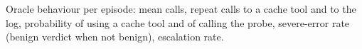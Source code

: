 \begin{table}[!htbp]
\centering
\caption{Oracle behaviour per episode: mean calls, repeat calls to a cache tool and to the log, probability of using a cache tool and of calling the probe, severe-error rate (benign verdict when not benign), escalation rate.}
\label{tab:agent-beh}
\small

\end{table}
